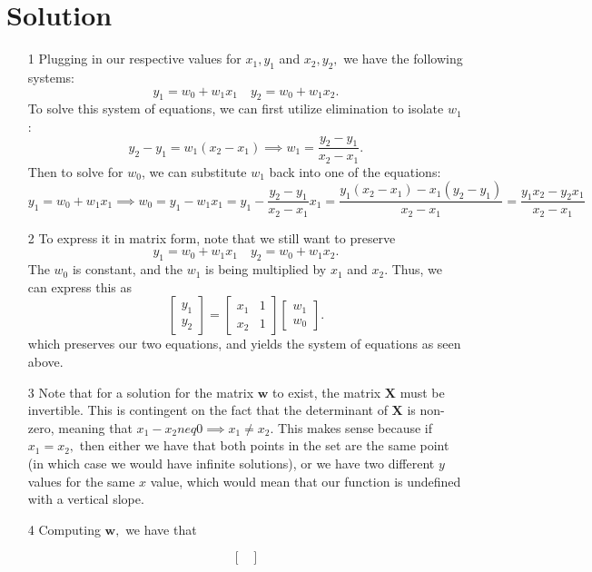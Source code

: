 \documentclass{../harvardml}
\theoremstyle{definition}
\theoremstyle{plain}
\newenvironment{solution}
  {\color{blue}\section*{Solution}}
{}
\begin{document}
\begin{solution}
	\begin{itemize}
        \item[1] Plugging in our respective values for $x_1,y_1$ and $x_2,y_2,$ we have the following systems: 
        $$y_1 = w_0 + w_1x_1 \quad y_2 = w_0 + w_1x_2.$$
        To solve this system of equations, we can first utilize elimination to isolate $w_1$:
        $$y_2 - y_1 = w_1(x_2 - x_1) \implies w_1 = \frac{y_2 - y_1}{x_2 - x_1}.$$
        Then to solve for $w_0$, we can substitute $w_1$ back into one of the equations:
        $$y_1 = w_0 + w_1x_1 \implies w_0 = y_1 - w_1x_1 = y_1 - \frac{y_2 - y_1}{x_2 - x_1}x_1 = \frac{y_1(x_2 - x_1) - x_1(y_2-y_1)}{x_2 - x_1} = \frac{y_1x_2 - y_2x_1}{x_2 - x_1}$$
        \item[2] To express it in matrix form, note that we still want to preserve 
        $$y_1 = w_0 + w_1x_1 \quad y_2 = w_0 + w_1x_2.$$
        The $w_0$ is constant, and the $w_1$ is being multiplied by $x_1$ and $x_2.$ Thus, we can express this as 
       $$
        \begin{bmatrix}
            y_1 \\
            y_2
        \end{bmatrix}
        =
        \begin{bmatrix}
            x_1 & 1 \\
            x_2 & 1
        \end{bmatrix}
        \begin{bmatrix}
            w_1 \\
            w_0
        \end{bmatrix}.
        $$
        which preserves our two equations, and yields the system of equations as seen above.
        \item[3] Note that for a solution for the matrix $\mathbf{w}$ to exist, the matrix $\mathbf{X}$ must be invertible. This is contingent on the fact that the determinant of $\mathbf{X}$ is non-zero, meaning that $x_1 - x_2 neq 0 \implies x_1 \neq x_2.$ This makes sense because if $x_1 = x_2,$ then either we have that both points in the set are the same point (in which case we would have infinite solutions), or we have two different $y$ values for the same $x$ value, which would mean that our function is undefined with a vertical slope.
        \item[4] Computing $\mathbf{w},$ we have that 
        \item[] $$
        \begin{bmatrix}

\end{bmatrix}$$
\end{itemize}
\end{solution}
\end{document}
